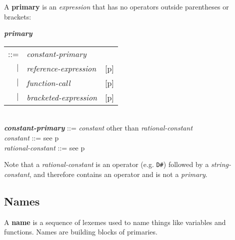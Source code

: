 \documentclass[12pt]{article}
\newcommand{\key}[1]{{\rm \bfseries #1}}
\newcommand{\emkey}[1]{{\em \bfseries #1}}
\newcommand{\pagref}[1]{p\pageref{#1}}
\newenvironment{indpar}[1][0.3in]%
	{\begin{list}{}%
		     {\setlength{\itemsep}{0in}%
		      \setlength{\topsep}{0in}%
		      \setlength{\parsep}{1ex}%
		      \setlength{\labelwidth}{#1}%
		      \setlength{\leftmargin}{#1}%
		      \addtolength{\leftmargin}{\labelsep}}%
	 \item}%
	{\end{list}}
\begin{document}
A \key{primary} is an {\em expression} that has no operators outside
parentheses or brackets:
\begin{indpar}
\emkey{primary}
    \begin{tabular}[t]{@{}rll}
    ::= & {\em constant-primary} \\
    $|$ & {\em reference-expression}    & [\pagref{REFERENCE-EXPRESSIONS}] \\
    $|$ & {\em function-call}		& [\pagref{FUNCTION-CALLS}] \\
    $|$ & {\em bracketed-expression}	& [\pagref{BRACKETED-EXPRESSIONS}] \\
    \end{tabular}
\\[0.5ex]
\emkey{constant-primary} ::= {\em constant} other than {\em rational-constant}
\\[0.5ex]
{\em constant} ::= see \pagref{CONSTANTS}
\\[0.5ex]
{\em rational-constant} ::= see \pagref{RATIONAL-CONSTANTS}

\end{indpar}

Note that a {\em rational-constant} is an operator (e.g. {\tt D\#})
followed by a {\em string-constant}, and therefore contains an operator
and is not a {\em primary}.

\subsection{Names}
\label{NAMES}

A \key{name} is a sequence of lexemes used to name things like
variables and functions.  Names are building blocks of primaries.
\end{document}
